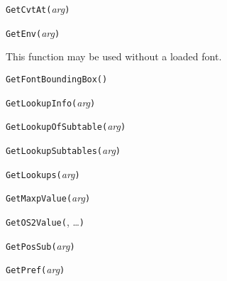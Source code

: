 

\texttt{GetCvtAt(}\textit{arg}\texttt{)}



\texttt{GetEnv(}\textit{arg}\texttt{)}

This function may be used without a loaded font.



\texttt{GetFontBoundingBox(}\texttt{)}



\texttt{GetLookupInfo(}\textit{arg}\texttt{)}



\texttt{GetLookupOfSubtable(}\textit{arg}\texttt{)}



\texttt{GetLookupSubtables(}\textit{arg}\texttt{)}



\texttt{GetLookups(}\textit{arg}\texttt{)}



\texttt{GetMaxpValue(}\textit{arg}\texttt{)}



\texttt{GetOS2Value(}, \ldots\texttt{)}



\texttt{GetPosSub(}\textit{arg}\texttt{)}



\texttt{GetPref(}\textit{arg}\texttt{)}

